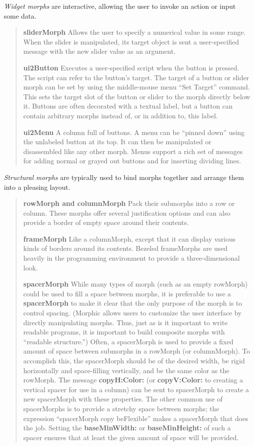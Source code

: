 \documentclass[letterpaper,10pt,english]{sphinxmanual}
\begin{document}
\emph{Widget morphs} are interactive, allowing the user to invoke an action or input some data.
\begin{quote}

\textbf{sliderMorph} Allows the user to specify a numerical value in some range. When the slider is manipulated, its target object is sent a user-specified message with the new slider value as an argument.

\textbf{ui2Button} Executes a user-specified script when the button is pressed. The script can refer to the button's target. The target of a button or slider morph can be set by using the middle-mouse menu “Set Target” command. This sets the target slot of the button or slider to the morph directly below it. Buttons are often decorated with a textual label, but a button can contain arbitrary morphs instead of, or in addition to, this label.

\textbf{ui2Menu} A column full of buttons. A menu can be “pinned down” using the unlabeled button at its top. It can then be manipulated or disassembled like any other morph. Menus support a rich set of messages for adding normal or grayed out buttons and for inserting dividing lines.
\end{quote}

\emph{Structural morphs} are typically used to bind morphs together and arrange them into a pleasing layout.
\begin{quote}

\textbf{rowMorph and columnMorph}  Pack their submorphs into a row or column. These morphs offer several justification options and can also provide a border of empty space around their contents.

\textbf{frameMorph}  Like a columnMorph, except that it can display various kinds of borders around its contents. Bezeled frameMorphs are used heavily in the programming environment to provide a three-dimensional look.

\textbf{spacerMorph} While many types of morph (such as an empty rowMorph) could be used to fill a space between morphs, it is preferable to use a \textbf{spacerMorph} to make it clear that the only purpose of the morph is to control spacing. (Morphic allows users to customize the user interface by directly manipulating morphs. Thus, just as is it important to write readable programs, it is important to build composite morphs with “readable structure.”) Often, a spacerMorph is used to provide a fixed amount of space between submorphs in a rowMorph (or columnMorph). To accomplish this, the spacerMorph should be of the desired width, be rigid horizontally and space-filling vertically, and be the same color as the rowMorph. The message \textbf{copyH:Color:} (or \textbf{copyV:Color:} to creating a vertical spacer for use in a column) can be sent to spacerMorph to create a new spacerMorph with these properties. The other common use of spacerMorphs is to provide a stretchy space between morphs; the expression “spacerMorph copy beFlexible” makes a spacerMorph that does the job. Setting the \textbf{baseMinWidth:} or \textbf{baseMinHeight:} of such a spacer ensures that at least the given amount of space will be provided.
\end{quote}
\end{document}
